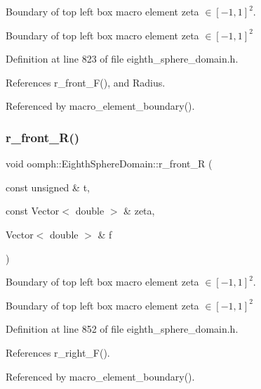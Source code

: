 Boundary of top left box macro element zeta $ \in [-1,1]^2 $. 

Boundary of top left box macro element zeta $ \in [-1,1]^2 $ 

Definition at line 823 of file eighth\+\_\+sphere\+\_\+domain.\+h.



References r\+\_\+front\+\_\+\+F(), and Radius.



Referenced by macro\+\_\+element\+\_\+boundary().

\mbox{\label{classoomph_1_1EighthSphereDomain_a5d32fe51e8ca993b12f911593ad46ca7}} 
\subsubsection{\texorpdfstring{r\+\_\+front\+\_\+\+R()}{r\_front\_R()}}
{\footnotesize\ttfamily void oomph\+::\+Eighth\+Sphere\+Domain\+::r\+\_\+front\+\_\+R (\begin{DoxyParamCaption}\item[{const unsigned \&}]{t,  }\item[{const Vector$<$ double $>$ \&}]{zeta,  }\item[{Vector$<$ double $>$ \&}]{f }\end{DoxyParamCaption})\hspace{0.3cm}{\ttfamily [private]}}



Boundary of top left box macro element zeta $ \in [-1,1]^2 $. 

Boundary of top left box macro element zeta $ \in [-1,1]^2 $ 

Definition at line 852 of file eighth\+\_\+sphere\+\_\+domain.\+h.



References r\+\_\+right\+\_\+\+F().



Referenced by macro\+\_\+element\+\_\+boundary().

\mbox{\label{classoomph_1_1EighthSphereDomain_aef12fa8f21592009e8ab51d88c301388}} 
